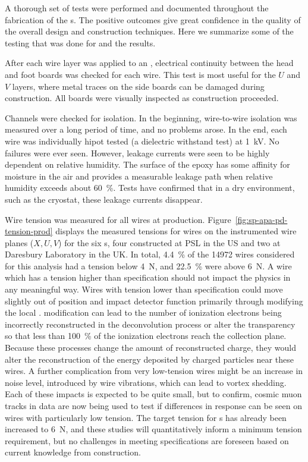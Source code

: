 A thorough set of  tests were performed and documented throughout the fabrication of the  s.  The positive outcomes give great confidence in the quality of the overall  design  and construction techniques.  Here we summarize some of the testing that was done for  and the results.   


After each wire layer was applied to an , electrical continuity between the head and foot boards was checked for each wire.  This test is most useful for the $U$ and $V$ layers, where metal traces on the side boards can be damaged during construction. All boards were visually inspected as construction proceeded.

Channels were checked for isolation.  In the beginning, wire-to-wire isolation was measured over a long period of time, and no problems arose.  In the end, each wire was individually hipot tested (a dielectric withstand test) at \SI{1}{kV}. No failures were ever seen. However, leakage currents were seen to be highly dependent on relative humidity.  The surface of the epoxy has some affinity for moisture in the air and provides a measurable leakage path when relative humidity exceeds about \SI{60}{\%}. Tests have confirmed that in a dry environment, such as the  cryostat, these leakage currents disappear.

Wire tension was measured for all wires at production.  Figure~\ref{fig:sp-apa-pd-tension-prod} displays the measured tensions for wires on the instrumented wire planes ($X, U, V$) for the six  s, four constructed at PSL in the US and two at Daresbury Laboratory in the UK.  %
In total, \SI{4.4}{\%} of the \num{14972} wires considered for this analysis had a tension below \SI{4}{N}, and \SI{22.5}{\%} were above \SI{6}{N}. 
A wire which has a tension higher than specification should not impact the physics in any meaningful way. Wires with tension lower than specification could move slightly out of position and impact detector function primarily through modifying the local \efield. \efield modification can lead to the number of ionization electrons being incorrectly reconstructed in the deconvolution process or alter the transparency so that less than \SI{100}{\%} of the ionization electrons reach the collection plane. Because these processes change the amount of reconstructed charge, they would alter the reconstruction of the energy deposited by charged particles near these wires. A further complication from very low-tension wires might be an increase in noise level, introduced by wire vibrations, which can lead to vortex shedding.  Each of these impacts is expected to be quite small, but to confirm, cosmic muon tracks in  data are now being used to test if differences in response can be seen on wires with particularly low tension.  The target tension for  s has already been increased to \SI{6}{N}, and these  studies will quantitatively inform a minimum tension requirement, but no challenges in meeting specifications are foreseen based on current knowledge from  construction.   



